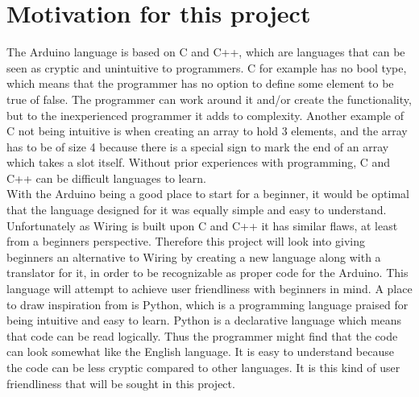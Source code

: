 \section{Motivation for this project}\label{introduction:motivation}
The Arduino language is based on C and C++, which are languages that can be seen as cryptic and unintuitive to programmers. C for example has no bool type, which means that the programmer has no option to define some element to be true of false. The programmer can work around it and/or create the functionality, but to the inexperienced programmer it adds to complexity. Another example of C not being intuitive is when creating an array to hold 3 elements, and the array has to be of size 4 because there is a special sign to mark the end of an array which takes a slot itself.  Without prior experiences with programming, C and C++ can be difficult languages to learn. \\

With the Arduino being a good place to start for a beginner, it would be optimal that the language designed for it was equally simple and easy to understand. Unfortunately as Wiring is built upon C and C++ it has similar flaws, at least from a beginners perspective. Therefore this project will look into giving beginners an alternative to Wiring by creating a new language along with a translator for it, in order to be recognizable as proper code for the Arduino. This language will attempt to achieve user friendliness with beginners in mind. A place to draw inspiration from is Python, which is a programming language praised for being intuitive and easy to learn. Python is a declarative language which means that code can be read logically.\cite{python:about} Thus the programmer might find that the code can look somewhat like the English language. It is easy to understand because the code can be less cryptic compared to other languages. It is this kind of user friendliness that will be sought in this project.